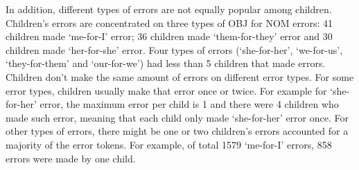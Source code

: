 In addition, different types of errors are not equally popular among children. Children's errors are concentrated on three types of OBJ for NOM errors: 41 children made `me-for-I' error; 36 children made `them-for-they' error and 30 children made `her-for-she' error. Four types of errors (`she-for-her', `we-for-us', `they-for-them' and `our-for-we') had less than 5 children that made errors. Children don't make the same amount of errors on different error types. For some error types, children usually make that error once or twice. For example for `she-for-her' error, the maximum error per child is 1 and there were 4 children who made such error, meaning that each child only made `she-for-her' error once. For other types of errors, there might be one or two children's errors accounted for a majority of the error tokens. For example, of total 1579 `me-for-I' errors, 858 errors were made by one child. 
 
